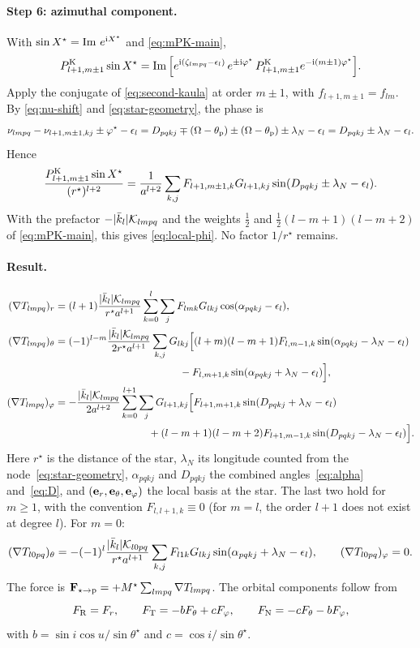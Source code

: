 \paragraph{Step 6: azimuthal component.} With $\sin X^\star=\operatorname{Im}\,e^{\mathrm{i} X^\star}$ and \eqref{eq:mPK-main},
\[
  P^{\mathrm K}_{l+1,m\pm1}\sin X^\star=\operatorname{Im}\Big[e^{\mathrm{i}(\zeta_{lmpq}-\epsilon_l)}\,e^{\pm\mathrm{i}\varphi^\star}\,P^{\mathrm K}_{l+1,m\pm1}e^{-\mathrm{i}(m\pm1)\varphi^\star}\Big].
\]
Apply the conjugate of \eqref{eq:second-kaula} at order $m\pm1$, with $f_{l+1,m\pm1}=f_{lm}$. By \eqref{eq:nu-shift} and \eqref{eq:star-geometry}, the phase is
\[
  \nu_{lmpq}-\nu_{l+1,m\pm1,kj}\pm\varphi^\star-\epsilon_l=D_{pqkj}\mp(\Omega-\theta_{\mathrm p})\pm(\Omega-\theta_{\mathrm p})\pm\lambda_N-\epsilon_l=D_{pqkj}\pm\lambda_N-\epsilon_l.
\]
Hence
\[
  \frac{P^{\mathrm K}_{l+1,m\pm1}\sin X^\star}{(r^\star)^{l+2}}=\frac{1}{a^{l+2}}\sum_{k,j}F_{l+1,m\pm1,k}G_{l+1,kj}\sin(D_{pqkj}\pm\lambda_N-\epsilon_l).
\]
With the prefactor $-|\bar k_l|\mathcal K_{lmpq}$ and the weights $\tfrac12$ and $\tfrac12(l-m+1)(l-m+2)$ of \eqref{eq:mPK-main}, this gives \eqref{eq:local-phi}. No factor $1/r^\star$ remains.

\paragraph{Result.}
\begin{align}
  (\nabla T_{lmpq})_r&=(l+1)\frac{|\kb_l|\mathcal K_{lmpq}}{r^\star a^{l+1}}\sum_{k=0}^{l}\sum_jF_{lmk}G_{lkj}\cos(\alpha_{pqkj}-\epsilon_l), \label{eq:local-r}\\
  (\nabla T_{lmpq})_\theta&=(-1)^{l-m}\frac{|\kb_l|\mathcal K_{lmpq}}{2r^\star a^{l+1}}\sum_{k,j}G_{lkj}\Big[(l+m)(l-m+1)F_{l,m-1,k}\sin(\alpha_{pqkj}-\lambda_N-\epsilon_l)\notag\\
  &\hspace{12em}-F_{l,m+1,k}\sin(\alpha_{pqkj}+\lambda_N-\epsilon_l)\Big], \label{eq:local-theta}\\
  (\nabla T_{lmpq})_\varphi&=-\frac{|\kb_l|\mathcal K_{lmpq}}{2a^{l+2}}\sum_{k=0}^{l+1}\sum_jG_{l+1,kj}\Big[F_{l+1,m+1,k}\sin(D_{pqkj}+\lambda_N-\epsilon_l)\notag\\
  &\hspace{9em}+(l-m+1)(l-m+2)F_{l+1,m-1,k}\sin(D_{pqkj}-\lambda_N-\epsilon_l)\Big]. \label{eq:local-phi}
\end{align}
Here $r^\star$ is the distance of the star, $\lambda_N$ its longitude counted from the node~\eqref{eq:star-geometry}, $\alpha_{pqkj}$ and $D_{pqkj}$ the combined angles~\eqref{eq:alpha} and~\eqref{eq:D}, and $(\mathbf e_r,\mathbf e_\theta,\mathbf e_\varphi)$ the local basis at the star. The last two hold for $m\ge1$, with the convention $F_{l,l+1,k}\equiv0$ (for $m=l$, the order $l+1$ does not exist at degree $l$). For $m=0$:
\[
  (\nabla T_{l0pq})_\theta=-(-1)^l\frac{|\bar k_l|\mathcal K_{l0pq}}{r^\star a^{l+1}}\sum_{k,j}F_{l1k}G_{lkj}\sin(\alpha_{pqkj}+\lambda_N-\epsilon_l),\qquad (\nabla T_{l0pq})_\varphi=0.
\]
The force is $\mathbf F_{\star\to\mathrm p}=+M^\star\sum_{lmpq}\nabla T_{lmpq}$. The orbital components follow from
\[
  F_{\rm R}=F_r,\qquad F_{\rm T}=-bF_\theta+cF_\varphi,\qquad F_{\rm N}=-cF_\theta-bF_\varphi,
\]
with $b=\sin i\cos u/\sin\theta^\star$ and $c=\cos i/\sin\theta^\star$.

